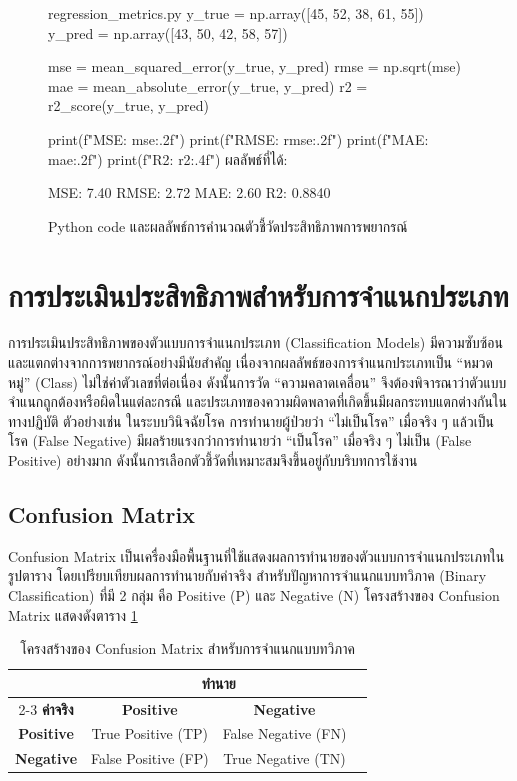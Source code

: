 \begin{exmp}
\begin{figure}[h]
\begin{pycode}{regression\_metrics.py}
y_true = np.array([45, 52, 38, 61, 55])
y_pred = np.array([43, 50, 42, 58, 57])

mse = mean_squared_error(y_true, y_pred)
rmse = np.sqrt(mse)
mae = mean_absolute_error(y_true, y_pred)
r2 = r2_score(y_true, y_pred)

print(f"MSE: {mse:.2f}")
print(f"RMSE: {rmse:.2f}")
print(f"MAE: {mae:.2f}")
print(f"R2: {r2:.4f}")
\tcblower
ผลลัพธ์ที่ได้:

MSE: 7.40
RMSE: 2.72
MAE: 2.60
R2: 0.8840
\end{pycode}
\caption{Python code และผลลัพธ์การคำนวณตัวชี้วัดประสิทธิภาพการพยากรณ์}
\label{fig:regression_metrics_code}
\end{figure}
\end{exmp}

\section{การประเมินประสิทธิภาพสำหรับการจำแนกประเภท}
การประเมินประสิทธิภาพของตัวแบบการจำแนกประเภท (Classification Models) มีความซับซ้อนและแตกต่างจากการพยากรณ์อย่างมีนัยสำคัญ เนื่องจากผลลัพธ์ของการจำแนกประเภทเป็น ``หมวดหมู่'' (Class) ไม่ใช่ค่าตัวเลขที่ต่อเนื่อง ดังนั้นการวัด ``ความคลาดเคลื่อน'' จึงต้องพิจารณาว่าตัวแบบจำแนกถูกต้องหรือผิดในแต่ละกรณี และประเภทของความผิดพลาดที่เกิดขึ้นมีผลกระทบแตกต่างกันในทางปฏิบัติ ตัวอย่างเช่น ในระบบวินิจฉัยโรค การทำนายผู้ป่วยว่า ``ไม่เป็นโรค'' เมื่อจริง ๆ แล้วเป็นโรค (False Negative) มีผลร้ายแรงกว่าการทำนายว่า ``เป็นโรค'' เมื่อจริง ๆ ไม่เป็น (False Positive) อย่างมาก ดังนั้นการเลือกตัวชี้วัดที่เหมาะสมจึงขึ้นอยู่กับบริบทการใช้งาน

\subsection{Confusion Matrix}
Confusion Matrix เป็นเครื่องมือพื้นฐานที่ใช้แสดงผลการทำนายของตัวแบบการจำแนกประเภทในรูปตาราง โดยเปรียบเทียบผลการทำนายกับค่าจริง สำหรับปัญหาการจำแนกแบบทวิภาค (Binary Classification) ที่มี 2 กลุ่ม คือ Positive (P) และ Negative (N) โครงสร้างของ Confusion Matrix แสดงดังตาราง \ref{table:confusion_matrix}

\begin{table}[h]
\centering
\caption{โครงสร้างของ Confusion Matrix สำหรับการจำแนกแบบทวิภาค}
\label{table:confusion_matrix}
\begin{tabular}{|c|c|c|c|}
\hline
 & \multicolumn{2}{c|}{\textbf{ทำนาย}} \\ \cline{2-3}
\textbf{ค่าจริง} & \textbf{Positive} & \textbf{Negative} \\ \hline
\textbf{Positive} & True Positive (TP) & False Negative (FN) \\ \hline
\textbf{Negative} & False Positive (FP) & True Negative (TN) \\ \hline
\end{tabular}
\end{table}

